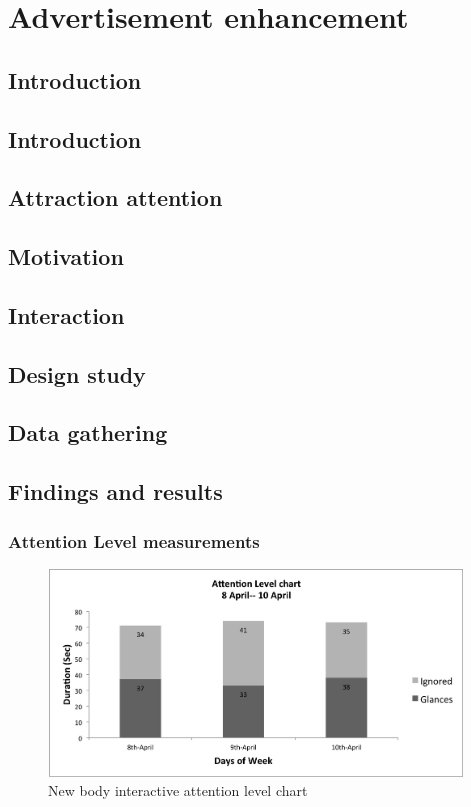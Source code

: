 \chapter{Advertisement enhancement} %

\label{Chapter9} %

\section{Introduction}


\section{Introduction}


\section{Attraction attention}
\section{Motivation}
\section{Interaction}
\section{Design study}
\section{Data gathering}




\section{Findings and results}

\subsection{Attention Level measurements}


\begin{figure}[H]
    \centering
    \includegraphics[width=110mm,height=55mm]{Figures/9/newbody_Inter_chart}%
    \caption{New body interactive attention level chart}%
    \label{fig:newbodyattentionlevelchart}%
\end{figure}



